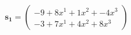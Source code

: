 \documentclass[preview]{standalone}
\begin{document}
\begin{align*}
\mathbf{s_1} = \begin{pmatrix}-9 + 8x^{1} + 1x^{2} + -4x^{3} \\ -3 + 7x^{1} + 4x^{2} + 8x^{3}\end{pmatrix}
\end{align*}
\end{document}

